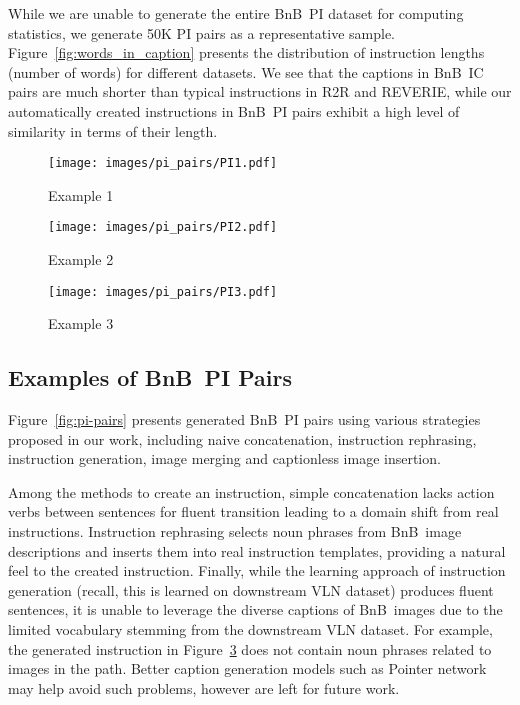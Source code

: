 \RequirePackage[dvipsnames,table]{xcolor} \documentclass[10pt,twocolumn,letterpaper]{article}
\newcommand{\airbnb}{BnB}
\begin{document}
While we are unable to generate the entire \airbnb~PI dataset for computing statistics, we generate 50K PI pairs as a representative sample.
Figure~\ref{fig:words_in_caption} presents the distribution of instruction lengths (number of words) for different datasets.
We see that the captions in \airbnb~IC pairs are much shorter than typical instructions in R2R and REVERIE, while our automatically created instructions in \airbnb~PI pairs exhibit a high level of similarity in terms of their length.






\begin{figure*}[t]
     \centering
     \begin{subfigure}[b]{0.9\textwidth}
         \centering
         \texttt{[image: images/pi\_pairs/PI1.pdf]}
         \caption{Example 1}
         \label{fig:pi-pair-1}
     \end{subfigure}
     \hfill
     \begin{subfigure}[b]{0.9\textwidth}
         \centering
         \texttt{[image: images/pi\_pairs/PI2.pdf]}
         \caption{Example 2}
         \label{fig:pi-pair-2}
     \end{subfigure}
     \hfill
     \begin{subfigure}[b]{0.9\textwidth}
         \centering
         \texttt{[image: images/pi\_pairs/PI3.pdf]}
         \caption{Example 3}
         \label{fig:pi-pair-3}
     \end{subfigure}
    \caption{Examples of path-instruction pairs created by different strategies. The images with dotted borders are images chosen from the \emph{captionless image insertion} strategy, and the clustered images are from the \emph{image merging} strategy.}
    \label{fig:pi-pairs}
\end{figure*}


\subsection{Examples of \airbnb~PI Pairs}
Figure~\ref{fig:pi-pairs} presents generated \airbnb~PI pairs using various strategies proposed in our work, including naive concatenation, instruction rephrasing, instruction generation, image merging and captionless image insertion.

Among the methods to create an instruction, simple concatenation lacks action verbs between sentences for fluent transition leading to a domain shift from real instructions.
Instruction rephrasing selects noun phrases from \airbnb~image descriptions and inserts them into real instruction templates, providing a natural feel to the created instruction.
Finally, while the learning approach of instruction generation (recall, this is learned on downstream VLN dataset) produces fluent sentences, it is unable to leverage the diverse captions of \airbnb~images due to the limited vocabulary stemming from the downstream VLN dataset.
For example, the generated instruction in Figure~\ref{fig:pi-pair-3} does not contain noun phrases related to images in the path.
Better caption generation models such as Pointer network~\cite{vinyals2015pointer}
may help avoid such problems, however are left for future work.
\end{document}
